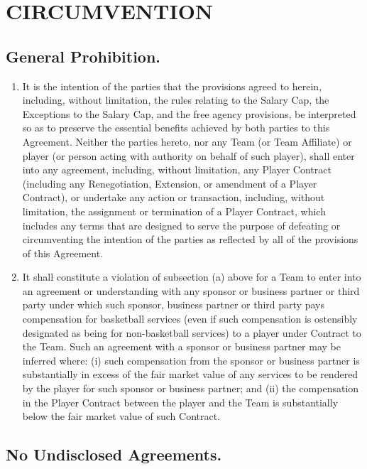 \documentclass[
]{book}
\providecommand{\tightlist}{%
  \setlength{\itemsep}{0pt}\setlength{\parskip}{0pt}}
\begin{document}
\hypertarget{circumvention}{%
\chapter{CIRCUMVENTION}\label{circumvention}}

\hypertarget{general-prohibition.}{%
\section{General Prohibition.}\label{general-prohibition.}}

\begin{enumerate}
\def\labelenumi{(\alph{enumi})}
\tightlist
\item
  It is the intention of the parties that the provisions agreed to herein, including, without limitation, the rules relating to the Salary Cap, the Exceptions to the Salary Cap, and the free agency provisions, be interpreted so as to preserve the essential benefits achieved by both parties to this Agreement. Neither the parties hereto, nor any Team (or Team Affiliate) or player (or person acting with authority on behalf of such player), shall enter into any agreement, including, without limitation, any Player Contract (including any Renegotiation, Extension, or amendment of a Player Contract), or undertake any action or transaction, including, without limitation, the assignment or termination of a Player Contract, which includes any terms that are designed to serve the purpose of defeating or circumventing the intention of the parties as reflected by all of the provisions of this Agreement.
\item
  It shall constitute a violation of subsection (a) above for a Team to enter into an agreement or understanding with any sponsor or business partner or third party under which such sponsor, business partner or third party pays compensation for basketball services (even if such compensation is ostensibly designated as being for non-basketball services) to a player under Contract to the Team. Such an agreement with a sponsor or business partner may be inferred where: (i) such compensation from the sponsor or business partner is substantially in excess of the fair market value of any services to be rendered by the player for such sponsor or business partner; and (ii) the compensation in the Player Contract between the player and the Team is substantially below the fair market value of such Contract.
\end{enumerate}

\hypertarget{no-undisclosed-agreements.}{%
\section{No Undisclosed Agreements.}\label{no-undisclosed-agreements.}}
\end{document}
